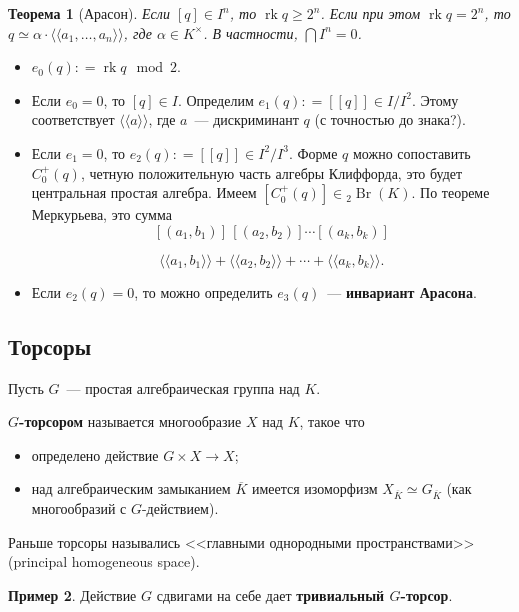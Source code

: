 \documentclass[a4paper]{article}
\DeclareMathOperator{\rk}{rk}
\DeclareMathOperator{\Br}{Br}
\newcommand{\term}{\textbf}
\newcommand{\dfn}{\mathrel{\mathop:}=}
\newcommand{\isom}{\simeq}
\newtheorem{theorem}{Теорема}[subsection]
\theoremstyle{definition}
\newtheorem{example}[theorem]{Пример}
\newcommand{\lAngle}{\langle\!\langle}
\newcommand{\rAngle}{\rangle\!\rangle}
\begin{document}
\begin{theorem}[Арасон]
Если $[q] \in I^n$, то $\rk q \ge 2^n$.
Если при этом $\rk q = 2^n$, то $q \isom \alpha \cdot \lAngle
a_1,\ldots,a_n \rAngle$, где $\alpha \in K^\times$.
В частности, $\bigcap I^n = 0$.
\end{theorem}

\begin{itemize}
\item $e_0 (q) \dfn \rk q \mod 2$.

\item Если $e_0 = 0$, то $[q] \in I$. Определим $e_1 (q) \dfn [\![q]\!] \in I/I^2$. Этому соответствует $\lAngle a\rAngle$, где $a$~--- дискриминант $q$ (с точностью до знака?).

\item Если $e_1 = 0$, то $e_2 (q) \dfn [\![ q ]\!] \in I^2/I^3$.
Форме $q$ можно сопоставить $C_0^+ (q)$, четную положительную часть алгебры
Клиффорда, это будет центральная простая алгебра. Имеем $[C_0^+ (q)]
\in {}_2 \Br (K)$. По теореме Меркурьева, это сумма
\[ [(a_1,b_1)]\,[(a_2,b_2)]\cdots [(a_k,b_k)] \]

\[ \lAngle a_1,b_1\rAngle + \lAngle a_2,b_2\rAngle + \cdots +\lAngle a_k,b_k\rAngle. \]

\item Если $e_2 (q) = 0$, то можно определить $e_3 (q)$~---
  \term{инвариант Арасона}.
\end{itemize}

\subsection{Торсоры}

Пусть $G$~--- простая алгебраическая группа над $K$.

\term{$G$-торсором} называется многообразие $X$ над $K$, такое что
\begin{itemize}
\item определено действие $G\times X\to X$;

\item над алгебраическим замыканием $\overline{K}$ имеется изоморфизм
  $X_{\overline{K}} \isom G_{\overline{K}}$ (как многообразий с
  $G$-действием).
\end{itemize}

Раньше торсоры назывались <<главными однородными пространствами>>
(principal homogeneous space).

\begin{example}
Действие $G$ сдвигами на себе дает \term{тривиальный $G$-торсор}.
\end{example}
\end{document}
